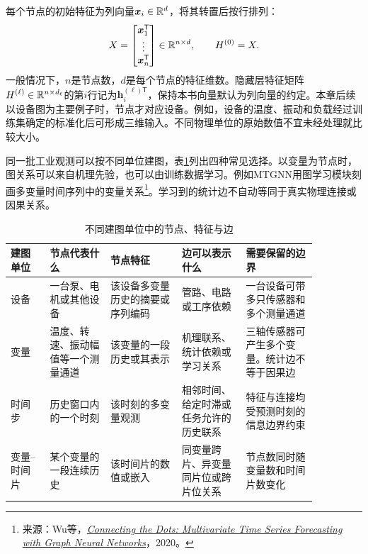 每个节点的初始特征为列向量$\bm x_i\in\mathbb{R}^d$，将其转置后按行排列：
\begin{equation}
 X=\begin{bmatrix}\bm x_1^{\mathsf T}\\\vdots\\\bm x_n^{\mathsf T}\end{bmatrix}\in\mathbb{R}^{n\times d},\qquad H^{(0)}=X.
 \label{eq:graph-feature-matrix}
\end{equation}
一般情况下，$n$是节点数，$d$是每个节点的特征维数。隐藏层特征矩阵$H^{(\ell)}\in\mathbb{R}^{n\times d_\ell}$的第$i$行记为$\bm h_i^{(\ell)\mathsf T}$，保持本书向量默认为列向量的约定。本章后续以设备图为主要例子时，节点才对应设备。例如，设备的温度、振动和负载经过训练集确定的标准化后可形成三维输入。不同物理单位的原始数值不宜未经处理就比较大小。

同一批工业观测可以按不同单位建图，表\ref{tab:graph-node-units}列出四种常见选择。以变量为节点时，图关系可以来自机理先验，也可以由训练数据学习。例如MTGNN用图学习模块刻画多变量时间序列中的变量关系\footnote{来源：Wu等，\href{https://arxiv.org/abs/2005.11650}{\textit{Connecting the Dots: Multivariate Time Series Forecasting with Graph Neural Networks}}，2020。}。学习到的统计边不自动等同于真实物理连接或因果关系。

\begin{table}[htbp]
\centering
\caption{不同建图单位中的节点、特征与边}
\label{tab:graph-node-units}
\footnotesize
\setlength{\tabcolsep}{2.5pt}
\renewcommand{\arraystretch}{1.18}
\begin{tabular}{@{}>{\raggedright\arraybackslash}m{0.11\linewidth}>{\raggedright\arraybackslash}m{0.17\linewidth}>{\raggedright\arraybackslash}m{0.20\linewidth}>{\raggedright\arraybackslash}m{0.18\linewidth}>{\raggedright\arraybackslash}m{0.20\linewidth}@{}}
\toprule
建图单位 & 节点代表什么 & 节点特征 & 边可以表示什么 & 需要保留的边界 \\
\midrule
设备 & 一台泵、电机或其他设备 & 该设备多变量历史的摘要或序列编码 & 管路、电路或工序依赖 & 一台设备可带多只传感器和多个测量通道 \\
变量 & 温度、转速、振动幅值等一个测量通道 & 该变量的一段历史或其表示 & 机理联系、统计依赖或学习关系 & 三轴传感器可产生多个变量。统计边不等于因果边 \\
时间步 & 历史窗口内的一个时刻 & 该时刻的多变量观测 & 相邻时间、给定时滞或任务允许的历史联系 & 特征与连接均受预测时刻的信息边界约束 \\
变量--时间片 & 某个变量的一段连续历史 & 该时间片的数值或嵌入 & 同变量跨片、异变量同片位或跨片位关系 & 节点数同时随变量数和时间片数变化 \\
\bottomrule
\end{tabular}
\end{table}

